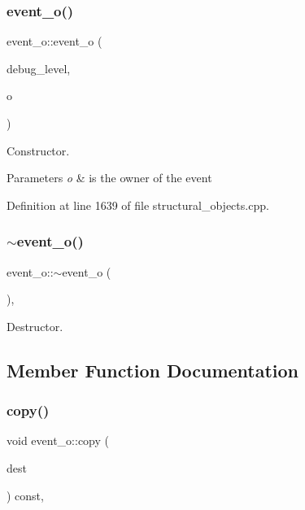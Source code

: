 \subsubsection{\texorpdfstring{event\+\_\+o()}{event\_o()}}
{\footnotesize\ttfamily event\+\_\+o\+::event\+\_\+o (\begin{DoxyParamCaption}\item[{int}]{debug\+\_\+level,  }\item[{const \hyperlink{structural__objects_8hpp_a8ea5f8cc50ab8f4c31e2751074ff60b2}{structural\+\_\+object\+Ref}}]{o }\end{DoxyParamCaption})}



Constructor. 


\begin{DoxyParams}{Parameters}
{\em o} & is the owner of the event \\
\hline
\end{DoxyParams}


Definition at line 1639 of file structural\+\_\+objects.\+cpp.

\mbox{\label{classevent__o_aa0e27b6701501b500ec7ab11acee2eea}} 
\subsubsection{\texorpdfstring{$\sim$event\+\_\+o()}{~event\_o()}}
{\footnotesize\ttfamily event\+\_\+o\+::$\sim$event\+\_\+o (\begin{DoxyParamCaption}{ }\end{DoxyParamCaption})\hspace{0.3cm}{\ttfamily [override]}, {\ttfamily [default]}}



Destructor. 



\subsection{Member Function Documentation}
\mbox{\label{classevent__o_acdd317b74f63cf9e7c5fe01aa5bbeb39}} 
\subsubsection{\texorpdfstring{copy()}{copy()}}
{\footnotesize\ttfamily void event\+\_\+o\+::copy (\begin{DoxyParamCaption}\item[{\hyperlink{structural__objects_8hpp_a8ea5f8cc50ab8f4c31e2751074ff60b2}{structural\+\_\+object\+Ref}}]{dest }\end{DoxyParamCaption}) const\hspace{0.3cm}{\ttfamily [override]}, {\ttfamily [virtual]}}



